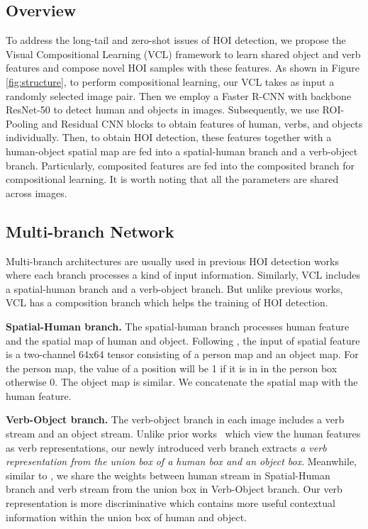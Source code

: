 \documentclass[runningheads]{llncs}
\begin{document}
\subsection{Overview}
To address the long-tail and zero-shot issues of HOI detection, we propose the Visual Compositional Learning (VCL) framework to learn shared object and verb features and compose novel HOI samples with these features. As shown in Figure \ref{fig:structure}, to perform compositional learning, our VCL takes as input a randomly selected image pair. Then we employ a Faster R-CNN \cite{ren2015faster} with backbone ResNet-50 \cite{he2016deep} to detect human and objects in images. Subsequently, we use ROI-Pooling and Residual CNN blocks to obtain features of human, verbs, and objects individually.
Then, to obtain HOI detection, these features together with a human-object spatial map are fed into a spatial-human branch and a verb-object branch. Particularly, composited features are fed into the composited branch for compositional learning.
It is worth noting that all the parameters are shared across images.


\subsection{Multi-branch Network}
\label{sec:multibranch}
Multi-branch architectures are usually used in previous HOI detection works \cite{chao2018learning, gao2018ican,li2018transferable} where each branch processes a kind of input information.
Similarly, VCL includes a spatial-human branch and a verb-object branch. But unlike previous works, VCL has a composition branch which helps the training of HOI detection.

\textbf{Spatial-Human branch.} The spatial-human branch processes human feature and the spatial map of human and object. Following \cite{gao2018ican}, the input of spatial feature is a two-channel 64x64 tensor consisting of a person map and an object map. For the person map, the value of a position will be 1 if it is in in the person box otherwise 0. The object map is similar. We concatenate the spatial map with the human feature.

\textbf{Verb-Object branch.} The verb-object branch in each image includes a verb stream and an object stream. Unlike prior works~\cite{gao2018ican, gupta2018no} which view the human features as verb representations, our newly introduced verb branch extracts \textit{a verb representation from the union box of a human box and an object box}. Meanwhile, similar to \cite{gao2018ican, gupta2018no}, we share the weights between human stream in Spatial-Human branch and verb stream from the union box in Verb-Object branch. Our verb representation is more discriminative which contains more useful contextual information within the union box of human and object.
\end{document}
